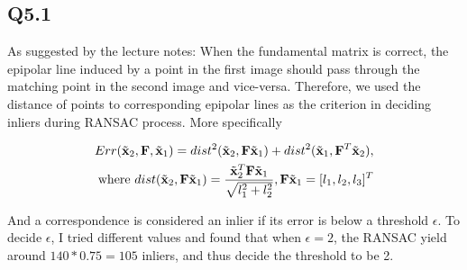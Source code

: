 \documentclass[11pt]{article}
\begin{document}
\subsection*{Q5.1}

As suggested by the lecture notes: When the fundamental matrix is correct, the epipolar line induced by a point in the first image should pass through the matching point in the second image and vice-versa.
Therefore, we used the distance of points to corresponding epipolar lines as the criterion in deciding inliers during RANSAC process. More specifically

\begin{align}
  Err(\tilde{\mathbf{x}}_2, \mathbf{F}, \tilde{\mathbf{x}}_1) = dist^2(\tilde{\mathbf{x}}_2, \mathbf{F} \tilde{\mathbf{x}}_1) + dist^2(\tilde{\mathbf{x}}_1, \mathbf{F}^T \tilde{\mathbf{x}}_2),  \\
  \textrm{where } dist(\tilde{\mathbf{x}}_2, \mathbf{F} \tilde{\mathbf{x}}_1) = \frac{\tilde{\mathbf{x}}_2^T \mathbf{F} \tilde{\mathbf{x}}_1}{\sqrt{l_1^2 + l_2^2}}, \mathbf{F} \tilde{\mathbf{x}}_1=[l_1, l_2, l_3]^T
\end{align}

And a correspondence is considered an inlier if its error is below a threshold $\epsilon$. To decide $\epsilon$, I tried different values and found that when $\epsilon=2$, the RANSAC yield around $140*0.75=105$ inliers, and thus decide the threshold to be 2.
\end{document}
